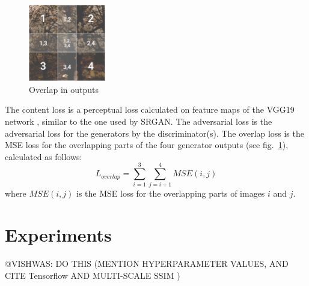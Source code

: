 \documentclass[12pt,a4paper,twocolumn]{article}
\begin{document}
        \begin{figure}
            \centering
            \includegraphics[width=0.3\textwidth]{images/overlap.png}
            \caption{Overlap in outputs}
            \label{fig:overlap}
        \end{figure}

        The content loss is a perceptual loss \cite{perceptual} calculated on feature maps of the VGG19 network \cite{vgg}, similar to the one used by SRGAN.
        The adversarial loss is the adversarial loss for the generators by the discriminator(s).
        The overlap loss is the MSE loss for the overlapping parts of the four generator outputs (see fig.~\ref{fig:overlap}), calculated as follows:
            $$L_{overlap} = \sum_{i=1}^3 \sum_{j=i+1}^4 MSE(i, j)$$
        where $MSE(i, j)$ is the MSE loss for the overlapping parts of images $i$ and $j$.

    \section{Experiments}
        @VISHWAS: DO THIS (MENTION HYPERPARAMETER VALUES, AND CITE Tensorflow \cite{tensorflow} AND MULTI-SCALE SSIM \cite{msssim})
\end{document}
